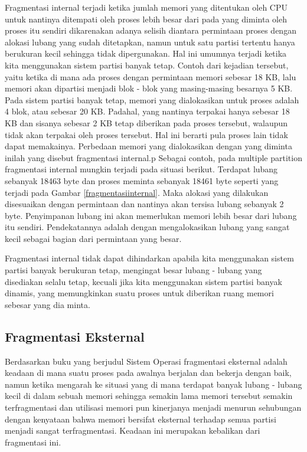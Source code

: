 Fragmentasi internal terjadi ketika jumlah memori yang ditentukan oleh CPU untuk nantinya ditempati oleh proses lebih besar dari pada yang diminta oleh proses itu sendiri dikarenakan adanya selisih diantara permintaan proses dengan alokasi lubang yang sudah ditetapkan, namun untuk satu partisi tertentu hanya berukuran kecil sehingga tidak dipergunakan. Hal ini umumnya terjadi ketika kita menggunakan sistem partisi banyak tetap. Contoh dari kejadian tersebut, yaitu ketika di mana ada proses dengan permintaan memori sebesar 18 KB, lalu memori akan dipartisi menjadi blok - blok yang masing-masing besarnya 5 KB. Pada sistem partisi banyak tetap, memori yang dialokasikan untuk proses adalah 4 blok, atau sebesar 20 KB. Padahal, yang nantinya terpakai hanya sebesar 18 KB dan sisanya sebesar 2 KB tetap diberikan pada proses tersebut, walaupun tidak akan terpakai oleh proses tersebut. Hal ini berarti pula proses lain tidak dapat memakainya. Perbedaan memori yang dialokasikan dengan yang diminta inilah yang disebut fragmentasi internal.p Sebagai contoh, pada multiple partition fragmentasi internal mungkin terjadi pada situasi berikut. Terdapat lubang sebanyak 18463 byte dan proses meminta sebanyak 18461 byte seperti yang terjadi pada Gambar \ref{fragmentasiinternal}. Maka alokasi yang dilakukan disesuaikan dengan permintaan dan nantinya akan tersisa lubang sebanyak 2 byte. Penyimpanan lubang ini akan memerlukan memori lebih besar dari lubang itu sendiri. Pendekatannya adalah dengan mengalokasikan lubang yang sangat kecil sebagai bagian dari permintaan yang besar.

Fragmentasi internal tidak dapat dihindarkan apabila kita menggunakan sistem partisi banyak berukuran tetap, mengingat besar lubang - lubang yang disediakan selalu tetap, kecuali jika kita menggunakan sistem partisi banyak dinamis, yang memungkinkan suatu proses untuk diberikan ruang memori sebesar yang dia minta.

\subsection{Fragmentasi Eksternal}
Berdasarkan buku yang berjudul Sistem Operasi \cite{pangera2005sistem} fragmentasi eksternal adalah keadaan di mana suatu proses pada awalnya berjalan dan bekerja dengan baik, namun ketika mengarah ke situasi yang di mana terdapat banyak lubang - lubang kecil di dalam sebuah memori sehingga semakin lama memori tersebut semakin terfragmentasi dan utilisasi memori pun kinerjanya menjadi menurun sehubungan dengan kenyataan bahwa memori bersifat eksternal terhadap semua partisi menjadi sangat terfragmentasi. Keadaan ini merupakan kebalikan dari fragmentasi ini.

